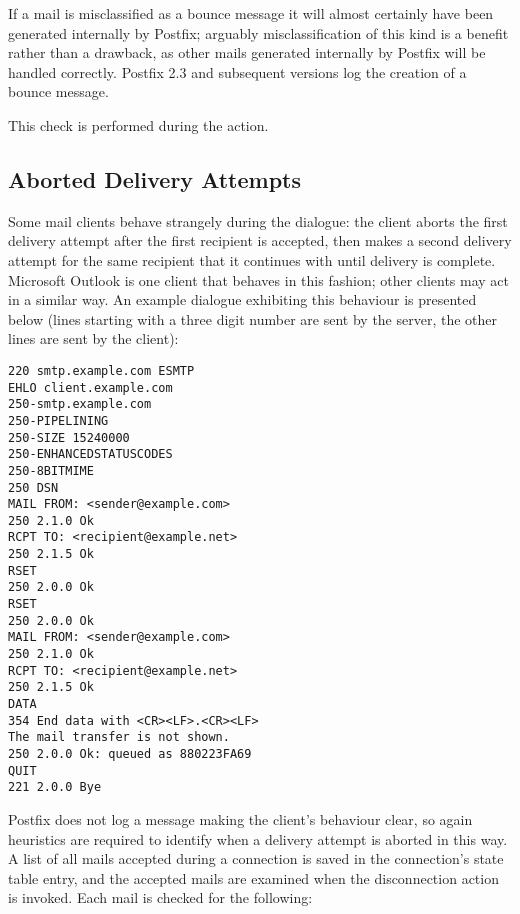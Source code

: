 If a mail is misclassified as a bounce message it will almost certainly
have been generated internally by Postfix; arguably misclassification of
this kind is a benefit rather than a drawback, as other mails generated
internally by Postfix will be handled correctly.  Postfix 2.3 and
subsequent versions log the creation of a bounce message.

This check is performed during the  action.

\subsection{Aborted Delivery Attempts}

\label{aborted delivery attempts}

Some mail clients behave strangely during the  dialogue: the
client aborts the first delivery attempt after the first recipient is
accepted, then makes a second delivery attempt for the same recipient that
it continues with until delivery is complete.  Microsoft Outlook is one
client that behaves in this fashion; other clients may act in a similar
way.  An example dialogue exhibiting this behaviour is presented below
(lines starting with a three digit number are sent by the server, the other
lines are sent by the client):

\begin{verbatim}
220 smtp.example.com ESMTP
EHLO client.example.com
250-smtp.example.com
250-PIPELINING
250-SIZE 15240000
250-ENHANCEDSTATUSCODES
250-8BITMIME
250 DSN
MAIL FROM: <sender@example.com>
250 2.1.0 Ok
RCPT TO: <recipient@example.net>
250 2.1.5 Ok
RSET
250 2.0.0 Ok
RSET
250 2.0.0 Ok
MAIL FROM: <sender@example.com>
250 2.1.0 Ok
RCPT TO: <recipient@example.net>
250 2.1.5 Ok
DATA
354 End data with <CR><LF>.<CR><LF>
The mail transfer is not shown.
250 2.0.0 Ok: queued as 880223FA69
QUIT
221 2.0.0 Bye
\end{verbatim}

Postfix does not log a message making the client's behaviour clear, so
again heuristics are required to identify when a delivery attempt is
aborted in this way.  A list of all mails accepted during a connection is
saved in the connection's state table entry, and the accepted mails are
examined when the disconnection action is invoked.  Each mail is checked
for the following:

